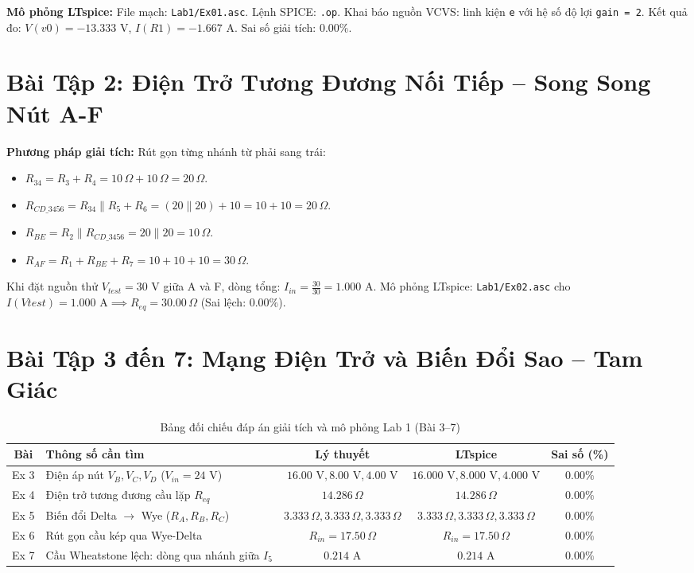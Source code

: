 \documentclass[12pt,a4paper]{report}
\begin{document}
\textbf{Mô phỏng LTspice:}
File mạch: \texttt{Lab1/Ex01.asc}. Lệnh SPICE: \lstinline|.op|.
Khai báo nguồn VCVS: linh kiện \lstinline|e| với hệ số độ lợi \lstinline|gain = 2|.
Kết quả đo: $V(v0) = -13.333\text{ V}$, $I(R1) = -1.667\text{ A}$. Sai số giải tích: $0.00\%$.

\section{Bài Tập 2: Điện Trở Tương Đương Nối Tiếp -- Song Song Nút A-F}
\textbf{Phương pháp giải tích:}
Rút gọn từng nhánh từ phải sang trái:
\begin{itemize}[noitemsep]
    \item $R_{34} = R_3 + R_4 = 10\,\Omega + 10\,\Omega = 20\,\Omega$.
    \item $R_{CD\_3456} = R_{34} \parallel R_5 + R_6 = (20 \parallel 20) + 10 = 10 + 10 = 20\,\Omega$.
    \item $R_{BE} = R_2 \parallel R_{CD\_3456} = 20 \parallel 20 = 10\,\Omega$.
    \item $R_{AF} = R_1 + R_{BE} + R_7 = 10 + 10 + 10 = 30\,\Omega$.
\end{itemize}
Khi đặt nguồn thử $V_{test} = 30\text{ V}$ giữa A và F, dòng tổng: $I_{in} = \frac{30}{30} = 1.000\text{ A}$.
Mô phỏng LTspice: \texttt{Lab1/Ex02.asc} cho $I(Vtest) = 1.000\text{ A} \implies R_{eq} = 30.00\,\Omega$ (Sai lệch: $0.00\%$).

\section{Bài Tập 3 đến 7: Mạng Điện Trở và Biến Đổi Sao -- Tam Giác}
\begin{table}[H]
\centering
\caption{Bảng đối chiếu đáp án giải tích và mô phỏng Lab 1 (Bài 3--7)}
\label{tab:ans_lab1_3_7}
\renewcommand{\arraystretch}{1.2}
\small
\begin{tabularx}{\textwidth}{|c|X|c|c|c|}
\hline
\rowcolor{codebg}
\textbf{Bài} & \textbf{Thông số cần tìm} & \textbf{Lý thuyết} & \textbf{LTspice} & \textbf{Sai số (\%)} \\ \hline
Ex 3 & Điện áp nút $V_B, V_C, V_D$ ($V_{in} = 24\text{ V}$) & $16.00\text{ V}, 8.00\text{ V}, 4.00\text{ V}$ & $16.000\text{ V}, 8.000\text{ V}, 4.000\text{ V}$ & $0.00\%$ \\ \hline
Ex 4 & Điện trở tương đương cầu lặp $R_{eq}$ & $14.286\,\Omega$ & $14.286\,\Omega$ & $0.00\%$ \\ \hline
Ex 5 & Biến đổi Delta $\to$ Wye ($R_A, R_B, R_C$) & $3.333\,\Omega, 3.333\,\Omega, 3.333\,\Omega$ & $3.333\,\Omega, 3.333\,\Omega, 3.333\,\Omega$ & $0.00\%$ \\ \hline
Ex 6 & Rút gọn cầu kép qua Wye-Delta & $R_{in} = 17.50\,\Omega$ & $R_{in} = 17.50\,\Omega$ & $0.00\%$ \\ \hline
Ex 7 & Cầu Wheatstone lệch: dòng qua nhánh giữa $I_5$ & $0.214\text{ A}$ & $0.214\text{ A}$ & $0.00\%$ \\ \hline
\end{tabularx}
\end{table}
\end{document}
